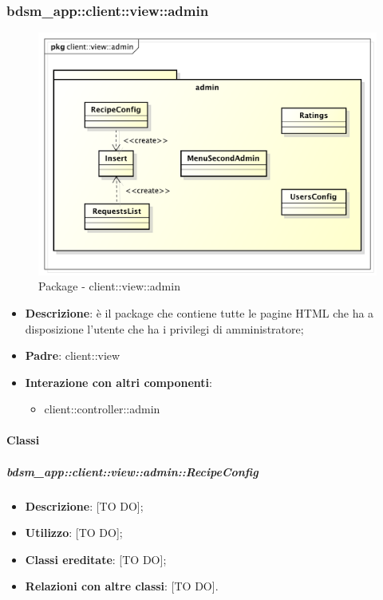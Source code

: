 	\subsubsection{bdsm\_app::client::view::admin} %
	\label{ssub:bdsm_app_client_view_admin}
	\begin{figure}[htbp]
		\centering
		\centerline{\includegraphics[scale=0.5]{./images/client_view_admin.pdf}}
		\caption{Package - client::view::admin}
	\end{figure}

	\begin{itemize}
		\item \textbf{Descrizione}: è il package che contiene tutte le pagine HTML che ha a disposizione l'utente che ha i privilegi di amministratore;
		\item \textbf{Padre}: client::view
		\item \textbf{Interazione con altri componenti}:
			\begin{itemize}
				\item client::controller::admin
			\end{itemize}
	\end{itemize}

		\paragraph{Classi} %
			\subparagraph{bdsm\_app::client::view::admin::RecipeConfig} %
			\label{subp:bdsm_app_client_view_admin_recipeconfig}
				\begin{itemize}
					\item \textbf{Descrizione}: [TO DO];
					\item \textbf{Utilizzo}: [TO DO];
					\item \textbf{Classi ereditate}: [TO DO];
					\item \textbf{Relazioni con altre classi}: [TO DO].
				\end{itemize}

